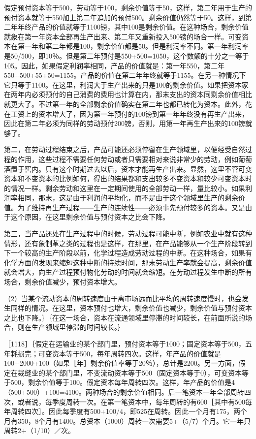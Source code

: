 假定预付资本等于500，劳动等于100，剩余价值等于50，这样，第二年用于生产的预付资本就等于550加上第二年追加的预付500。剩余价值仍然等于50。这样，到第二年年终产品的价值就等于1100镑，其中100是剩余价值。在这种场合，剩余价值就象在第一年资本全部再生产出来、第二年又重新投入500镑的场合一样。可变资本在第一年和第二年都是100，剩余价值都是50。但是利润率不同。第一年利润率是50/500，即10％。但是第二年预付是550+500=1050，这个数额的十分之一等于105。因此，如果假定利润率相同，产品的价值就是：第一年550，第二年550+500+55+50=1155。产品的价值在第二年年终就等于1155。在另一种情况下它只等于1100。在这里，利润大于生产出来的只是100的剩余价值。如果把资本家在两年内必须预付的自己消费的费用也计算在内，那末支出的资本同剩余价值相比就更大了。不过第一年的全部剩余价值确实在第二年也都已转化为资本。此外，花在工资上的资本增大了，因为第一年预付的100镑到第一年年终没有再生产出来，因此在第二年必须为同样的劳动预付200镑，否则，用第一年再生产出来的100镑就够了。

第二，在劳动过程结束之后，产品可能还必须停留在生产领域里，以便经受自然过程的作用，这些过程不需要任何劳动或者只需要相对来说非常少的劳动，例如葡萄酒置于窖内。只有这个时期过去以后，资本才能再生产出来。显然，这里不管可变资本和不变资本的比例如何，得出的结果都和支出较多不变资本和较少可变资本时的情况一样。剩余劳动和这里在一定期间使用的全部劳动一样，量比较小。如果利润率相同，那末，这是由于利润的平均化，而不是由于这个领域里生产的剩余价值。为了维持再生产过程——生产的连续性——必须事先预付较多的资本。又是由于这个原因，在这里剩余价值与预付资本之比会下降。

第三，当产品还处在生产过程中的时候，劳动过程可能中断，例如农业中就有这种情形，还有象制革之类的过程也是这样，在那里，在产品能够从一个生产阶段转到下一个较高的生产阶段以前，化学过程造成劳动过程的中断。在这种场合，如果有化学方面的发现来缩短这种中断的持续时间，那末劳动生产率就会提高，剩余价值就会增大，向生产过程预付物化劳动的时间就会缩短。在劳动过程发生中断的所有场合，剩余价值减少，预付资本增大。

（2）当某个流动资本的周转速度由于离市场远而比平均的周转速度慢时，也会发生同样的情况。在这里，资本预付也增大，剩余价值也减少，剩余价值与预付资本之比也下降。｝｛在这一场合，资本在流通领域里停滞的时间较长，在前面所说的场合，则在生产领域里停滞的时间较长。｝

［1118］｛假定在运输业的某个部门里，预付资本等于1000；固定资本等于500，五年耗损完；可变资本等于500，每年周转四次。这样，年产品的价值就是100+2000+100（如果［年］剩余价值率等于20％），总计是2200。另一方面，假定在裁缝业的某个部门里，不变流动资本等于500（固定资本等于0），可变资本等于500，剩余价值等于100。假定资本每年周转四次。这样，年产品的价值是4（500+500）+100=4100。两种场合的剩余价值相同。后一笔资本一年全部周转四次，或者说，每季度周转一次。在第一笔资本中，每年周转的有600［其中有500每年周转四次］。因此每季度有500+100/4，即525在周转。因此一个月有175，两个月有350，8个月有1400。总资本（1000）周转一次需要5+（5/7）个月。它一年只周转2+（1/10）／次。

